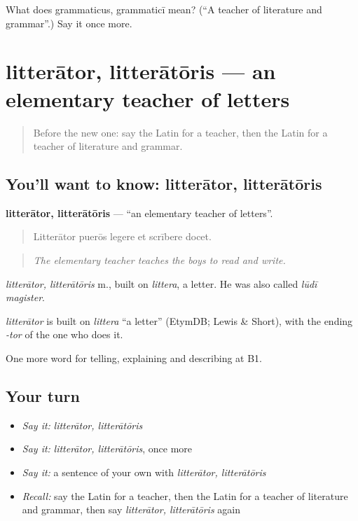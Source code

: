 \begin{tcolorbox}[breakable,colback=teal!4,colframe=teal!35!black,title={Before you move on}]
What does grammaticus, grammaticī mean? (\textquotedblleft{}A teacher of literature and grammar\textquotedblright{}.) Say it once more.
\end{tcolorbox}
\section[litterātor, litterātōris]{litterātor, litterātōris — an elementary teacher of letters}

\label{lesson:LA-C401-litterator}



\begin{quote}
Before the new one: say the Latin for a teacher, then the Latin for a teacher of literature and grammar.
\end{quote}

\subsection*{You'll want to know: litterātor, litterātōris}
\textbf{litterātor, litterātōris} — \textquotedblleft{}an elementary teacher of letters\textquotedblright{}.

\begin{quote}
Litterātor puerōs legere et scrībere docet.
\end{quote}

\begin{quote}
\emph{The elementary teacher teaches the boys to read and write.}
\end{quote}

\emph{litterātor, litterātōris} m., built on \emph{littera}, a letter. He was also called \emph{lūdī magister}.

\begin{cousinweb}
\emph{litterātor} is built on \emph{littera} \textquotedblleft{}a letter\textquotedblright{} (EtymDB; Lewis \& Short), with the ending \emph{-tor} of the one who does it.
\end{cousinweb}

\begin{grammarlens}[title={What you've built}]
One more word for telling, explaining and describing at B1.
\end{grammarlens}

\subsection*{Your turn}
\begin{itemize}
\raggedright
  \item \emph{Say it:} \emph{litterātor, litterātōris}
  \item \emph{Say it:} \emph{litterātor, litterātōris}, once more
  \item \emph{Say it:} a sentence of your own with \emph{litterātor, litterātōris}
  \item \emph{Recall:} say the Latin for a teacher, then the Latin for a teacher of literature and grammar, then say \emph{litterātor, litterātōris} again
\end{itemize}

